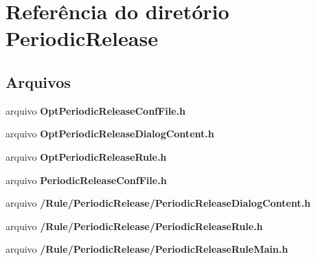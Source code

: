 \section{Referência do diretório Periodic\+Release}
\label{dir_62e6cff0f7cbe2b395e7bcf5f57dddc4}
\subsection*{Arquivos}
\begin{DoxyCompactItemize}
\item 
arquivo {\bf Opt\+Periodic\+Release\+Conf\+File.\+h}
\item 
arquivo {\bf Opt\+Periodic\+Release\+Dialog\+Content.\+h}
\item 
arquivo {\bf Opt\+Periodic\+Release\+Rule.\+h}
\item 
arquivo {\bf Periodic\+Release\+Conf\+File.\+h}
\item 
arquivo {\bf /\+Rule/\+Periodic\+Release/\+Periodic\+Release\+Dialog\+Content.\+h}
\item 
arquivo {\bf /\+Rule/\+Periodic\+Release/\+Periodic\+Release\+Rule.\+h}
\item 
arquivo {\bf /\+Rule/\+Periodic\+Release/\+Periodic\+Release\+Rule\+Main.\+h}
\end{DoxyCompactItemize}
